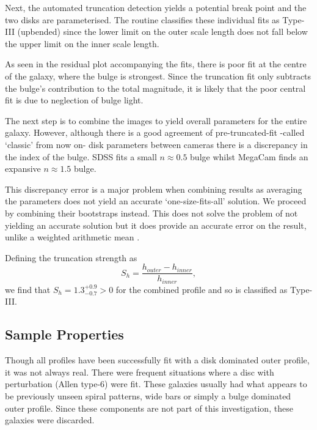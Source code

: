 Next, the automated truncation detection yields a potential break point and the two disks are parameterised. The routine classifies these individual fits as Type-III (upbended) since the lower limit on the outer scale length does not fall below the upper limit on the inner scale length. 

As seen in the residual plot accompanying the fits, there is poor fit at the centre of the galaxy, where the bulge is strongest. Since the truncation fit only subtracts the bulge's contribution to the total magnitude, it is likely that the poor central fit is due to neglection of bulge light.

The next step is to combine the images to yield overall parameters for the entire galaxy. However, although there is a good agreement of pre-truncated-fit -called `classic' from now on- disk parameters between cameras there is a discrepancy in the \sersic index of the bulge. SDSS fits a small $n\approx 0.5$ bulge whilst MegaCam finds an expansive $n\approx 1.5$ bulge. 

This discrepancy error is a major problem when combining results as averaging the parameters does not yield an accurate `one-size-fits-all' solution. We proceed by combining their bootstraps instead. This does not solve the problem of not yielding an accurate solution but it does provide an accurate error on the result, unlike a weighted arithmetic mean \citep{andrae_error_2010}. 

Defining the truncation strength as 
\begin{equation}
	S_h =  \frac{h_{outer} - h_{inner}}{h_{inner}},
\end{equation}
we find that $S_h = 1.3^{+0.9}_{-0.7} > 0$ for the combined profile and so is classified as Type-III.




\subsection{Sample Properties}
Though all profiles have been successfully fit with a disk dominated outer profile, it was not always real. There were frequent situations where a disc with perturbation (Allen type-6) were fit. These galaxies usually had what appears to be previously unseen spiral patterns, wide bars or simply a bulge dominated outer profile. Since these components are not part of this investigation, these galaxies were discarded.

